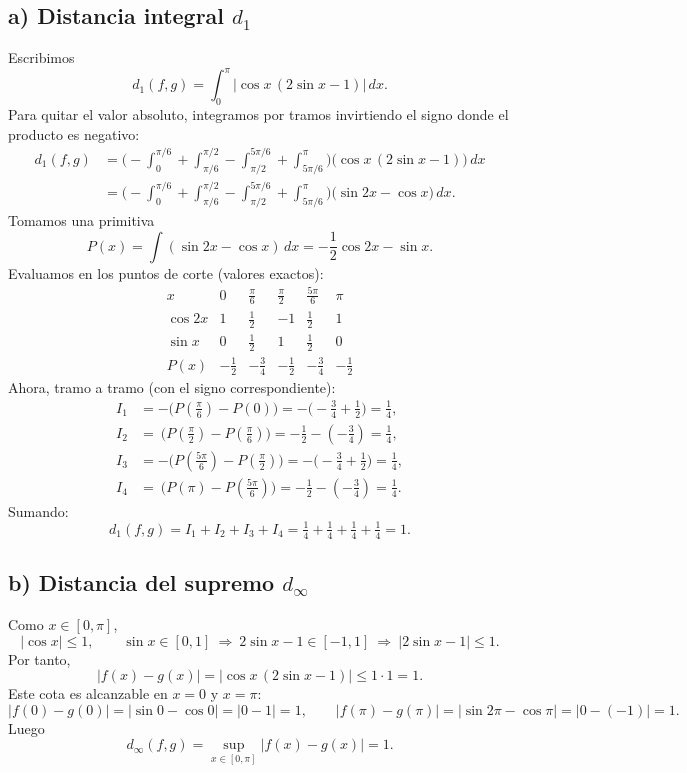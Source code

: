 \documentclass[12pt]{article}
\begin{document}
\subsection*{a) Distancia integral $d_1$}
Escribimos
\[
d_1(f,g)=\int_0^\pi \big|\cos x\,(2\sin x-1)\big|\,dx.
\]
Para quitar el valor absoluto, integramos por tramos invirtiendo el signo
donde el producto es negativo:
\[
\begin{aligned}
d_1(f,g)
&=\Big(
-\!\!\int_{0}^{\pi/6}
+\int_{\pi/6}^{\pi/2}
-\!\!\int_{\pi/2}^{5\pi/6}
+\int_{5\pi/6}^{\pi}
\Big)\big(\cos x\,(2\sin x-1)\big)\,dx\\[2mm]
&=\Big(
-\!\!\int_{0}^{\pi/6}
+\int_{\pi/6}^{\pi/2}
-\!\!\int_{\pi/2}^{5\pi/6}
+\int_{5\pi/6}^{\pi}
\Big)\big(\sin 2x-\cos x\big)\,dx.
\end{aligned}
\]
Tomamos una primitiva
\[
P(x)=\int (\sin 2x-\cos x)\,dx
=-\frac{1}{2}\cos 2x-\sin x.
\]
Evaluamos en los puntos de corte (valores exactos):
\[
\begin{array}{c|ccccc}
x & 0 & \frac{\pi}{6} & \frac{\pi}{2} & \frac{5\pi}{6} & \pi \\ \hline
\cos 2x & 1 & \frac{1}{2} & -1 & \frac{1}{2} & 1 \\
\sin x  & 0 & \frac{1}{2} & 1 & \frac{1}{2} & 0 \\
P(x)    & -\tfrac12 & -\tfrac34 & -\tfrac12 & -\tfrac34 & -\tfrac12
\end{array}
\]
Ahora, tramo a tramo (con el signo correspondiente):
\[
\begin{aligned}
I_1&=-\big(P(\tfrac{\pi}{6})-P(0)\big) = -\big(-\tfrac34+ \tfrac12\big)=\tfrac14,\\
I_2&= \ \big(P(\tfrac{\pi}{2})-P(\tfrac{\pi}{6})\big)= -\tfrac12-(-\tfrac34)=\tfrac14,\\
I_3&=-\big(P(\tfrac{5\pi}{6})-P(\tfrac{\pi}{2})\big)= -\big(-\tfrac34+ \tfrac12\big)=\tfrac14,\\
I_4&= \ \big(P(\pi)-P(\tfrac{5\pi}{6})\big)= -\tfrac12-(-\tfrac34)=\tfrac14.
\end{aligned}
\]
Sumando:
\[
d_1(f,g)=I_1+I_2+I_3+I_4=\tfrac14+\tfrac14+\tfrac14+\tfrac14=\boxed{1}.
\]

\subsection*{b) Distancia del supremo $d_\infty$}
Como $x\in[0,\pi]$,
\[
|\cos x|\le 1,\qquad \sin x\in[0,1]\ \Rightarrow\ 2\sin x-1\in[-1,1]\ \Rightarrow\ |2\sin x-1|\le 1.
\]
Por tanto,
\[
|f(x)-g(x)|=\big|\cos x\,(2\sin x-1)\big|\le 1\cdot 1=1.
\]
Este cota es alcanzable en $x=0$ y $x=\pi$:
\[
|f(0)-g(0)|=|\sin 0-\cos 0|=|0-1|=1,\qquad
|f(\pi)-g(\pi)|=|\sin 2\pi-\cos\pi|=|0-(-1)|=1.
\]
Luego
\[
d_\infty(f,g)=\sup_{x\in[0,\pi]} |f(x)-g(x)|=\boxed{1}.
\]
\end{document}
